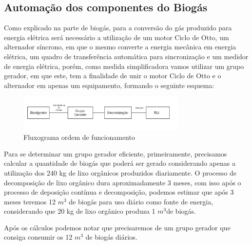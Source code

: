 \subsection{Automação dos componentes do Biogás}
Como explicado na parte de biogás, para a conversão do gás produzido para energia elétrica será necessário a utilização de um motor Ciclo de Otto, um alternador síncrono, em que o mesmo converte a energia mecânica em energia elétrica, um quadro de transferência automática para sincronização e um medidor de energia elétrica, porém, como medida simplificadora vamos utilizar um grupo gerador, em que este, tem a finalidade de unir o motor Ciclo de Otto e o alternador em apenas um equipamento, formando o seguinte esquema:
\begin{figure}[!h]
	\centering
	\includegraphics[width=0.75\textwidth]{figuras/ordemFuncBiodigestor.png}
	\caption{Fluxograma ordem de funcionamento}
	\label{fig:funcbiodigestor}
\end{figure}

Para se determinar um grupo gerador eficiente, primeiramente, precisamos calcular a quantidade de biogás que poderá ser gerado considerando apenas a utilização dos 240 kg de lixo orgânicos produzidos diariamente. O processo de decomposição de lixo orgânico dura aproximadamente 3 meses, com isso após o processo de deposição contínua e decomposição, podemos estimar que após 3 meses teremos 12 $m^{3}$ de biogás para uso diário como fonte de energia, considerando que 20 kg de lixo orgânico produza 1 $m^{3}$de biogás. 

Após os cálculos podemos notar que precisaremos de um grupo gerador que consiga consumir os 12 $m^{3}$ de biogás diários.

